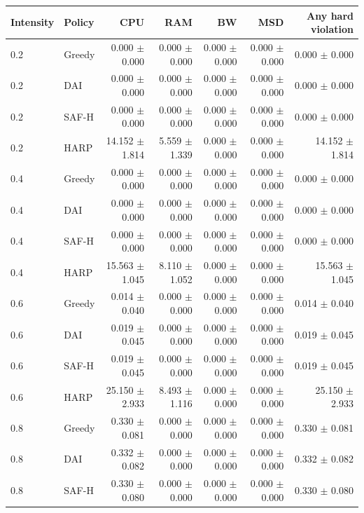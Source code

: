\begin{table}[p]
\centering
\color{revisiongreen}\small
\begin{tabular}{llrrrrr}
\toprule
Intensity & Policy & CPU & RAM & BW & MSD & Any hard violation \\
\midrule
0.2 & Greedy & 0.000 $\pm$ 0.000 & 0.000 $\pm$ 0.000 & 0.000 $\pm$ 0.000 & 0.000 $\pm$ 0.000 & 0.000 $\pm$ 0.000 \\
0.2 & DAI & 0.000 $\pm$ 0.000 & 0.000 $\pm$ 0.000 & 0.000 $\pm$ 0.000 & 0.000 $\pm$ 0.000 & 0.000 $\pm$ 0.000 \\
0.2 & SAF-H & 0.000 $\pm$ 0.000 & 0.000 $\pm$ 0.000 & 0.000 $\pm$ 0.000 & 0.000 $\pm$ 0.000 & 0.000 $\pm$ 0.000 \\
0.2 & HARP & 14.152 $\pm$ 1.814 & 5.559 $\pm$ 1.339 & 0.000 $\pm$ 0.000 & 0.000 $\pm$ 0.000 & 14.152 $\pm$ 1.814 \\
0.4 & Greedy & 0.000 $\pm$ 0.000 & 0.000 $\pm$ 0.000 & 0.000 $\pm$ 0.000 & 0.000 $\pm$ 0.000 & 0.000 $\pm$ 0.000 \\
0.4 & DAI & 0.000 $\pm$ 0.000 & 0.000 $\pm$ 0.000 & 0.000 $\pm$ 0.000 & 0.000 $\pm$ 0.000 & 0.000 $\pm$ 0.000 \\
0.4 & SAF-H & 0.000 $\pm$ 0.000 & 0.000 $\pm$ 0.000 & 0.000 $\pm$ 0.000 & 0.000 $\pm$ 0.000 & 0.000 $\pm$ 0.000 \\
0.4 & HARP & 15.563 $\pm$ 1.045 & 8.110 $\pm$ 1.052 & 0.000 $\pm$ 0.000 & 0.000 $\pm$ 0.000 & 15.563 $\pm$ 1.045 \\
0.6 & Greedy & 0.014 $\pm$ 0.040 & 0.000 $\pm$ 0.000 & 0.000 $\pm$ 0.000 & 0.000 $\pm$ 0.000 & 0.014 $\pm$ 0.040 \\
0.6 & DAI & 0.019 $\pm$ 0.045 & 0.000 $\pm$ 0.000 & 0.000 $\pm$ 0.000 & 0.000 $\pm$ 0.000 & 0.019 $\pm$ 0.045 \\
0.6 & SAF-H & 0.019 $\pm$ 0.045 & 0.000 $\pm$ 0.000 & 0.000 $\pm$ 0.000 & 0.000 $\pm$ 0.000 & 0.019 $\pm$ 0.045 \\
0.6 & HARP & 25.150 $\pm$ 2.933 & 8.493 $\pm$ 1.116 & 0.000 $\pm$ 0.000 & 0.000 $\pm$ 0.000 & 25.150 $\pm$ 2.933 \\
0.8 & Greedy & 0.330 $\pm$ 0.081 & 0.000 $\pm$ 0.000 & 0.000 $\pm$ 0.000 & 0.000 $\pm$ 0.000 & 0.330 $\pm$ 0.081 \\
0.8 & DAI & 0.332 $\pm$ 0.082 & 0.000 $\pm$ 0.000 & 0.000 $\pm$ 0.000 & 0.000 $\pm$ 0.000 & 0.332 $\pm$ 0.082 \\
0.8 & SAF-H & 0.330 $\pm$ 0.080 & 0.000 $\pm$ 0.000 & 0.000 $\pm$ 0.000 & 0.000 $\pm$ 0.000 & 0.330 $\pm$ 0.080 \\

\end{tabular}
\end{table}
